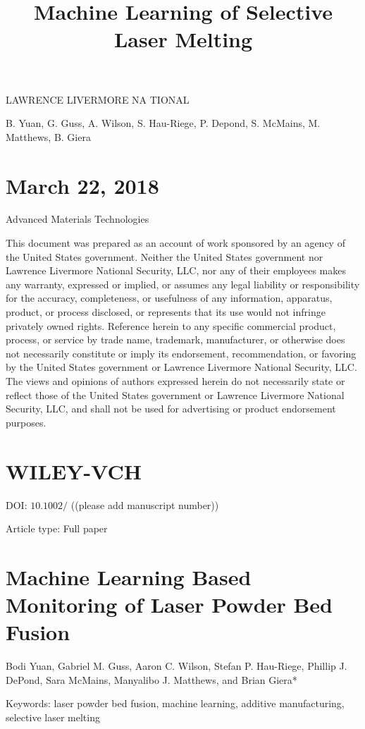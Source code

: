 \documentclass[10pt]{article}
\title{Machine Learning of Selective Laser Melting }
\author{}
\date{}
\begin{document}
\maketitle
LAWRENCE LIVERMORE NA TIONAL

B. Yuan, G. Guss, A. Wilson, S. Hau-Riege, P. Depond, S. McMains, M. Matthews, B. Giera

\section*{March 22, 2018}
Advanced Materials Technologies

This document was prepared as an account of work sponsored by an agency of the United States government. Neither the United States government nor Lawrence Livermore National Security, LLC, nor any of their employees makes any warranty, expressed or implied, or assumes any legal liability or responsibility for the accuracy, completeness, or usefulness of any information, apparatus, product, or process disclosed, or represents that its use would not infringe privately owned rights. Reference herein to any specific commercial product, process, or service by trade name, trademark, manufacturer, or otherwise does not necessarily constitute or imply its endorsement, recommendation, or favoring by the United States government or Lawrence Livermore National Security, LLC. The views and opinions of authors expressed herein do not necessarily state or reflect those of the United States government or Lawrence Livermore National Security, LLC, and shall not be used for advertising or product endorsement purposes.

\section*{WILEY-VCH}
DOI: $10.1002 /$ ((please add manuscript number))

Article type: Full paper

\section*{Machine Learning Based Monitoring of Laser Powder Bed Fusion}
Bodi Yuan, Gabriel M. Guss, Aaron C. Wilson, Stefan P. Hau-Riege, Phillip J. DePond, Sara McMains, Manyalibo J. Matthews, and Brian Giera*

Keywords: laser powder bed fusion, machine learning, additive manufacturing, selective laser melting
\end{document}
